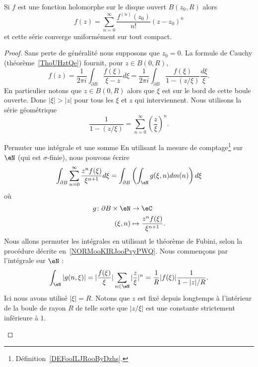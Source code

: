 \begin{theorem}     \label{THOooSULFooHTLRPE}
	Si \( f\) est une fonction holomorphe sur le disque ouvert \( B(z_0,R)\) alors
	\begin{equation}
		f(z)=\sum_{n=0}^{\infty}\frac{ f^{(n)}(z_0) }{ n! }(z-z_0)^n
	\end{equation}
	et cette série converge uniformément sur tout compact.
\end{theorem}

\begin{proof}
	Sans perte de généralité nous supposons que \( z_0=0\). La formule de Cauchy (théorème~\ref{ThoUHztQe}) fournit, pour \( z\in B(0,R)\),
	\begin{equation}
		f(z)=\frac{1}{ 2\pi i }\int_{\partial B}\frac{ f(\xi) }{ \xi-z }d\xi=\frac{1}{ 2\pi i }\int_{\partial B}\frac{ f(\xi) }{ 1-(z/\xi) }\frac{ d\xi }{ \xi }.
	\end{equation}
	En particulier notons que \( z\in B(0,R)\) alors que \( \xi\) est sur le bord de cette boule ouverte. Donc \( | \xi |>| z |\) pour tous les \( \xi\) et \( z\) qui interviennent. Nous utilisons la série géométrique
	\begin{equation}
		\frac{1}{ 1-(z/\xi) }=\sum_{n=0}^{\infty}\left( \frac{ z }{ \xi } \right)^n.
	\end{equation}

	\begin{subproof}
		\item[Permuter une intégrale et une somme]
		En utilisant la mesure de comptage\footnote{Définition~\ref{DEFooILJRooByDzhs}.} sur \( \eN\) (qui est \( \sigma\)-finie), nous pouvons écrire
		\begin{equation}        \label{EQooWOLOooFHSrsx}
			\int_{\partial B}\sum_{n=0}^{\infty}\frac{ z^nf(\xi) }{ \xi^{n+1} }d\xi= \int_{\partial B}\left( \int_{\eN}g(\xi,n)dm(n) \right)d\xi
		\end{equation}
		où \begin{equation}
			\begin{aligned}
				g\colon \partial B\times \eN & \to \eC                                  \\
				(\xi,n)                      & \mapsto \frac{ z^nf(\xi) }{ \xi^{n+1} }.
			\end{aligned}
		\end{equation}
		Nous allons permuter les intégrales en utilisant le théorème de Fubini, selon la procédure décrite en~\ref{NORMooKIRJooPvyPWQ}. Nous commençons par l'intégrale sur \( \eN\) :
		\begin{equation}        \label{EQooLQLOooKiSAKH}
			\int_{\eN}| g(n,\xi) |=| \frac{ f(\xi) }{ \xi } |\sum_{n\in \eN}| \frac{ z }{ \xi } |^n=\frac{1}{ R }| f(\xi) |\frac{1}{ 1-| z |/R }.
		\end{equation}
		Ici nous avons utilisé \( | \xi |=R\). Notons que \( z\) est fixé depuis longtemps à l'intérieur de la boule de rayon \( R\) de telle sorte que \( | z/\xi |\) est une constante strictement inférieure à \( 1\).


\end{subproof}
\end{proof}
